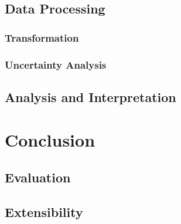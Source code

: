 \documentclass[a4paper,12pt]{article}
\begin{document}
\subsection{Data Processing}

\subsubsection{Transformation}

\subsubsection{Uncertainty Analysis}

\subsection{Analysis and Interpretation}

\section{Conclusion}

\subsection{Evaluation}

\subsection{Extensibility}

\pagebreak

\printbibliography
\end{document}
